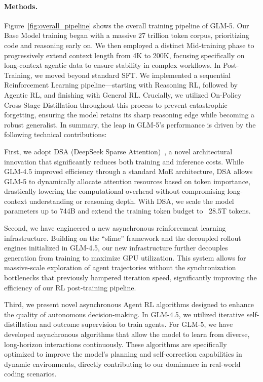 \documentclass{article}
\theoremstyle{definition}
\begin{document}
\paragraph{Methods.} Figure~\ref{fig:overall_pipeline} shows the overall training pipeline of GLM-5.
Our Base Model training began with a massive 27 trillion token corpus, prioritizing code and reasoning early on. We then employed a distinct Mid-training phase to progressively extend context length from 4K to 200K, focusing specifically on long-context agentic data to ensure stability in complex workflows.
In Post-Training, we moved beyond standard SFT. We implemented a sequential Reinforcement Learning pipeline—starting with Reasoning RL, followed by Agentic RL, and finishing with General RL. Crucially, we utilized On-Policy Cross-Stage Distillation throughout this process to prevent catastrophic forgetting, ensuring the model retains its sharp reasoning edge while becoming a robust generalist.
In summary, the leap in GLM-5’s performance is driven by the following technical contributions:

First, we adopt DSA (DeepSeek Sparse Attention)~\cite{deepseekai2025deepseekv32pushingfrontieropen}, a novel architectural innovation that significantly reduces both training and inference costs. While GLM-4.5 improved efficiency through a standard MoE architecture, DSA allows GLM-5 to dynamically allocate attention resources based on token importance, drastically lowering the computational overhead without compromising long-context understanding or reasoning depth. With DSA, we scale the model parameters up to 744B and extend the training token budget to ~28.5T tokens.

Second, we have engineered a new asynchronous reinforcement learning infrastructure. Building on the ``slime'' framework and the decoupled rollout engines initialized in GLM-4.5, our new infrastructure further decouples generation from training to maximize GPU utilization. This system allows for massive-scale exploration of agent trajectories without the synchronization bottlenecks that previously hampered iteration speed, significantly improving the efficiency of our RL post-training pipeline.

Third, we present novel asynchronous Agent RL algorithms designed to enhance the quality of autonomous decision-making. In GLM-4.5, we utilized iterative self-distillation and outcome supervision to train agents. For GLM-5, we have developed asynchronous algorithms that allow the model to learn from diverse, long-horizon interactions continuously. These algorithms are specifically optimized to improve the model's planning and self-correction capabilities in dynamic environments, directly contributing to our dominance in real-world coding scenarios.
\end{document}
